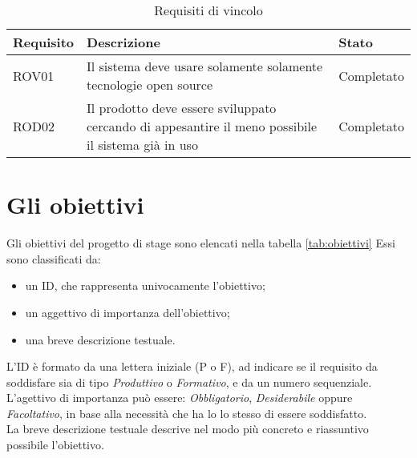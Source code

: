\begin{table}
	\centering
	\caption{Requisiti di vincolo}
	\label{tab:requisiti-di-vincolo}
	\begin{tabular}{|p{3cm}|p{8cm}|p{3cm}|}
		\hline
		\rule[-4mm]{0mm}{1cm}
		Requisito & Descrizione & Stato\\
		\hline
		\rule[-3mm]{0mm}{0.8cm}
		ROV01&Il sistema deve usare solamente solamente tecnologie open source&Completato\\
		\hline
		\rule[-3mm]{0mm}{0.8cm}
		ROD02&Il prodotto deve essere sviluppato cercando di appesantire il meno possibile il sistema già in uso &Completato\\
		\hline	
	\end{tabular}
\end{table}

\section{Gli obiettivi}
Gli obiettivi del progetto di stage sono elencati nella tabella \ref{tab:obiettivi}
Essi sono classificati da:

\begin{itemize}
	\item un ID, che rappresenta univocamente l'obiettivo;
	\item un aggettivo di importanza dell'obiettivo;
	\item una breve descrizione testuale.
\end{itemize}

L'ID è formato da una lettera iniziale (P o F), ad indicare se il requisito da soddisfare sia di tipo \emph{Produttivo} o \emph{Formativo}, e da un numero sequenziale.\\
L'agettivo di importanza può essere: \emph{Obbligatorio}, \emph{Desiderabile} oppure \emph{Facoltativo}, in base alla necessità che ha lo lo stesso di essere soddisfatto.\\
La breve descrizione testuale descrive nel modo più concreto e riassuntivo possibile l'obiettivo.\\

